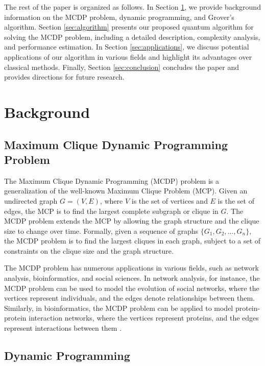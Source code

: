 The rest of the paper is organized as follows. In Section \ref{sec:background}, we provide background information on the MCDP problem, dynamic programming, and Grover's algorithm. Section \ref{sec:algorithm} presents our proposed quantum algorithm for solving the MCDP problem, including a detailed description, complexity analysis, and performance estimation. In Section \ref{sec:applications}, we discuss potential applications of our algorithm in various fields and highlight its advantages over classical methods. Finally, Section \ref{sec:conclusion} concludes the paper and provides directions for future research.

\section{Background}
\label{sec:background}

\subsection{Maximum Clique Dynamic Programming Problem}

The Maximum Clique Dynamic Programming (MCDP) problem is a generalization of the well-known Maximum Clique Problem (MCP). Given an undirected graph $G = (V, E)$, where $V$ is the set of vertices and $E$ is the set of edges, the MCP is to find the largest complete subgraph or clique in $G$. The MCDP problem extends the MCP by allowing the graph structure and the clique size to change over time. Formally, given a sequence of graphs $\{G_1, G_2, \dots, G_n\}$, the MCDP problem is to find the largest cliques in each graph, subject to a set of constraints on the clique size and the graph structure.

The MCDP problem has numerous applications in various fields, such as network analysis, bioinformatics, and social sciences. In network analysis, for instance, the MCDP problem can be used to model the evolution of social networks, where the vertices represent individuals, and the edges denote relationships between them. Similarly, in bioinformatics, the MCDP problem can be applied to model protein-protein interaction networks, where the vertices represent proteins, and the edges represent interactions between them \cite{applications}.

\subsection{Dynamic Programming}

